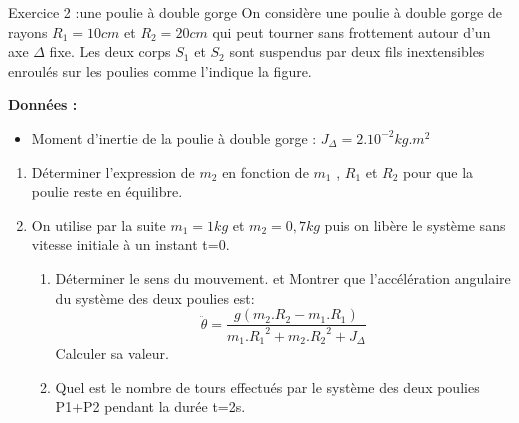\documentclass[12pt, french]{article}
\begin{document}
\begin{Box2}{Exercice 2 :une poulie à double gorge }
  On considère une poulie à double gorge de rayons $R_1=10cm$ et $R_2=20cm$ qui peut tourner sans frottement autour d'un axe $\Delta$ fixe. Les deux corps $S_1$ et $S_2$ sont suspendus par deux fils inextensibles enroulés sur les poulies comme l'indique la figure.

\begin{center}
\end{center}


\textbf{Données : }
\begin{itemize}
    \item Moment d'inertie de la poulie à double gorge : $J_{\Delta} = 2.10^{-2}kg.m^2$

\end{itemize}

\begin{enumerate}

	\item 	Déterminer l'expression de $m_2$ en fonction de $m_1$ , $R_1$ et $R_2$ pour que la poulie reste en équilibre.
    \item On utilise par la suite $m_1=1kg$ et $m_2=0,7kg$ puis on libère le système sans vitesse initiale à un instant t=0. 
		\begin{enumerate}

			\item Déterminer le sens du mouvement. et Montrer que l'accélération angulaire du système des deux poulies est:
                $$\ddot{\theta} = \frac{g(m_2.R_2 - m_1.R_1)}{m_1.{R_1}^2 + m_2.{R_2}^2 + J_{\Delta}}$$
                Calculer sa valeur.
            \item Quel est le nombre de tours effectués par le système des deux poulies {P1+P2} pendant la durée t=2s.
		\end{enumerate}

\end{enumerate}

\end{Box2}
\end{document}
